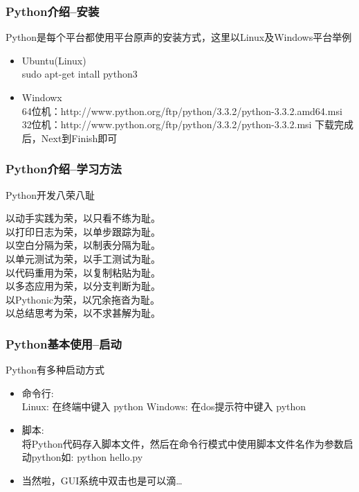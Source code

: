 \documentclass[xcolor=dvipsnames]{beamer}
\begin{document}
\begin{frame}
    \frametitle{Python介绍--安装}
    Python是每个平台都使用平台原声的安装方式，这里以Linux及Windows平台举例
    \begin{itemize}[<+->]
        \item
            Ubuntu(Linux)\\
            sudo apt-get intall python3 
        \item
            Windowx\\
            64位机：http://www.python.org/ftp/python/3.3.2/python-3.3.2.amd64.msi
            32位机：http://www.python.org/ftp/python/3.3.2/python-3.3.2.msi
            下载完成后，Next到Finish即可
    \end{itemize} 
\end{frame}

\begin{frame}
    \frametitle{Python介绍--学习方法}
    Python开发\alert{八荣八耻}\\
    \begin{center}
        \pause
        以动手实践为荣，以只看不练为耻。\\
        \pause
        以打印日志为荣，以单步跟踪为耻。\\
        \pause
        以空白分隔为荣，以制表分隔为耻。\\
        \pause
        以单元测试为荣，以手工测试为耻。\\
        \pause
        以代码重用为荣，以复制粘贴为耻。\\
        \pause
        以多态应用为荣，以分支判断为耻。\\
        \pause
        以Pythonic为荣，以冗余拖沓为耻。\\
        \pause 
        以总结思考为荣，以不求甚解为耻。\\
    \end{center}
\end{frame}

\begin{frame}
    \frametitle{Python基本使用--启动}
    Python有多种启动方式
    \begin{itemize}[<+->]
        \item 命令行:\\
            Linux:   在终端中键入 python
            Windows: 在dos提示符中键入 python
        \item 脚本:\\
            将Python代码存入脚本文件，然后在命令行模式中使用脚本文件名作为参数启动python如: python hello.py
        \item 当然啦，GUI系统中双击也是可以滴\ldots
    \end{itemize} 
\end{frame}
\end{document}
